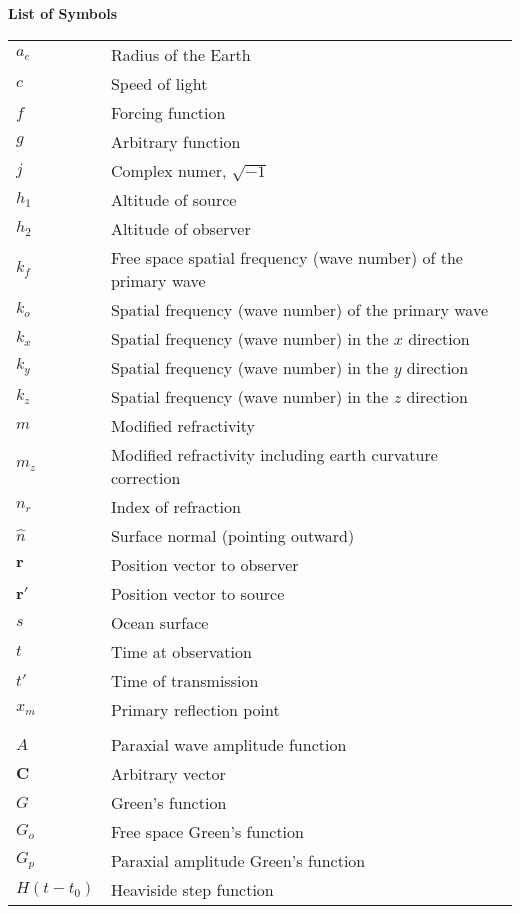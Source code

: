 \noindent\Large{\bf{List of Symbols}}

\vspace{24pt}

\small\normalsize
\begin{supertabular}{ll}
$a_e$ & Radius of the Earth \\
$c$ & Speed of light \\
$f$ & Forcing function \\
$g$ & Arbitrary function \\
$j$ & Complex numer, $\sqrt{-1}$ \\
$h_1$ & Altitude of source\\
$h_2$ & Altitude of observer\\
$k_f$ & Free space spatial frequency (wave number) of the primary wave \\
$k_o$ & Spatial frequency (wave number) of the primary wave \\
$k_x$ & Spatial frequency (wave number) in the $x$ direction \\
$k_y$ & Spatial frequency (wave number) in the $y$ direction \\
$k_z$ & Spatial frequency (wave number) in the $z$ direction \\
$m$ & Modified refractivity \\
$m_z$ & Modified refractivity including earth curvature correction\\
$n_r$ & Index of refraction \\
$\hat{n}$ & Surface normal (pointing outward) \\
$\mathbf{r}$ & Position vector to observer \\
$\mathbf{r}'$ & Position vector to source \\
$s$ & Ocean surface \\
$t$ & Time at observation\\
$t'$ & Time of transmission\\
$x_m$ & Primary reflection point \\
\\
$A$ & Paraxial wave amplitude function \\
$\mathbf{C}$ & Arbitrary vector \\
$G$ & Green's function \\
$G_o$ & Free space Green's function \\
$G_p$ & Paraxial amplitude Green’s function \\
$H(t-t_0)$ & Heaviside step function \\

\end{supertabular}
